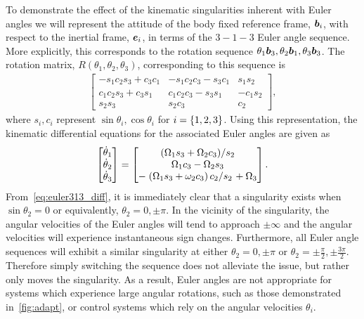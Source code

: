\documentclass[10pt,fleqn]{IJCAS}  %
\begin{document}
\begin{multicols}{2}
To demonstrate the effect of the kinematic singularities inherent with Euler angles we will represent the attitude of the body fixed reference frame, \( \bm{b}_i \), with respect to the inertial frame, \( \bm{e}_i\), in terms of the \( 3-1-3\) Euler angle sequence.
More explicitly, this corresponds to the rotation sequence \( \theta_1 \bm{b}_3 , \theta_2 \bm{b}_1, \theta_3 \bm{b}_3 \).
The rotation matrix, \( R(\theta_1, \theta_2, \theta_3) \), corresponding to this sequence is 
\begin{align}\label{eq:euler313}
    \begin{bmatrix}
        -s_1 c_2 s_3 + c_3 c_1 & -s_1 c_2 c_3 - s_3 c_1 & s_1s_2 \\
        c_1 c_2 s_3 + c_3 s_1 & c_1 c_2 c_3 - s_3 s_1 & - c_1 s_2 \\
        s_2 s_3 & s_2 c_3 & c_2
    \end{bmatrix} ,
\end{align}
where \( s_i, c_i \) represent \( \sin \theta_i, \cos \theta_i \) for \( i = \left\{ 1,2,3 \right\}\).
Using this representation, the kinematic differential equations for the associated Euler angles are given as
\begin{align}\label{eq:euler313_diff}
    \begin{bmatrix}
        \dot{\theta}_1 \\ \dot{\theta}_2 \\ \dot{\theta}_3 
    \end{bmatrix}
    =
    \begin{bmatrix}
        \left.\left( \Omega_1 s_3 + \Omega_2 c_3 \right)\middle/s_2\right. \\
        \Omega_1 c_3 - \Omega_2 s_3 \\
        -\left.\left( \Omega_1 s_3 + \omega_2 c_3 \right)c_2\middle/s_2\right. + \Omega_3
    \end{bmatrix} .
\end{align}
From~\cref{eq:euler313_diff}, it is immediately clear that a singularity exists when \( \sin \theta_2 = 0 \) or equivalently, \( \theta_2 = 0, \pm \pi \). 
In the vicinity of the singularity, the angular velocities of the Euler angles will tend to approach \( \pm \infty \) and the angular velocities will experience instantaneous sign changes.
Furthermore, all Euler angle sequences will exhibit a similar singularity at either \( \theta_2 = 0, \pm \pi \) or \( \theta_2 = \pm \frac{\pi}{2}, \pm \frac{3\pi}{2} \).
Therefore simply switching the sequence does not alleviate the issue, but rather only moves the singularity.
As a result, Euler angles are not appropriate for systems which experience large angular rotations, such as those demonstrated in~\cref{fig:adapt}, or control systems which rely on the angular velocities \( \theta_i \).

\end{multicols}
\end{document}
